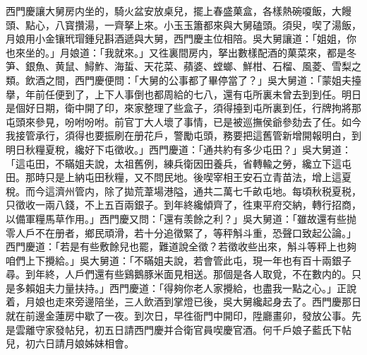 西門慶讓大舅房内坐的，騎火盆安放桌兒，擺上春盛菓盒，各樣熱碗嗄飯，大饅頭、點心，八寳攢湯，一齊拏上來。小玉玉簫都來與大舅磕頭。須臾，喫了湯飯，月娘用小金镶玳瑁鍾兒斟酒遞與大舅，西門慶主位相陪。吳大舅讓道：「姐姐，你也來坐的。」月娘道：「我就來。」又徃裏間房内，拏出數樣配酒的菓菜來，都是冬笋、銀魚、黄鼠、鱘鮓、海蜇、天花菜、蘋婆、螳螂、鮮柑、石榴、風菱、雪梨之類。飲酒之間，西門慶便問：「大舅的公事都了畢停當了？」吳大舅道：「蒙姐夫擡擧，年前任便到了，上下人事倒也都周給的七八，還有屯所裏未曾去到到任。明日是個好日期，衛中開了印，來家整理了些盒子，須得擡到屯所裏到任，行牌拘將那屯頭來參見，吩咐吩咐。前官丁大人壞了事情，已是被巡撫侯爺參劾去了任。如今我接管承行，須得也要振刷在册花戶，警勵屯頭，務要把這舊管新增開報明白，到明日秋糧夏稅，纔好下屯徵收。」西門慶道：「通共約有多少屯田？」吳大舅道：「這屯田，不瞞姐夫說，太祖舊例，練兵衛因田養兵，省轉輸之勞，纔立下這屯田。那時只是上納屯田秋糧，又不問民地。後喫宰相王安石立青苗法，增上這夏稅。而今這濟州管内，除了拋荒葦場港隘，通共二萬七千畝屯地。每頃秋税夏税，只徵收一兩八錢，不上五百兩銀子。到年終纔傾齊了，徃東平府交納，轉行招商，以備軍糧馬草作用。」西門慶又問：「還有羡餘之利？」吳大舅道：「雖故還有些抛零人戶不在册者，鄉民頑滑，若十分追徵緊了，等秤斛斗重，恐聲口致起公論。」西門慶道：「若是有些敷餘兒也罷，難道說全徵？若徵收些出來，斛斗等秤上也夠咱們上下攪給。」吳大舅道：「不瞞姐夫說，若會管此屯，現一年也有百十兩銀子尋。到年終，人戶們還有些鷄鵝豚米面見相送。那個是各人取覓，不在數内的。只是多賴姐夫力量扶持。」西門慶道：「得夠你老人家攪給，也盡我一點之心。」正說着，月娘也走來旁邊陪坐，三人飲酒到掌燈已後，吳大舅纔起身去了。西門慶那日就在前邊金蓮房中歇了一夜。到次日，早徃衙門中開印，陞廳畫卯，發放公事。先是雲離守家發帖兒，初五日請西門慶并合衛官員喫慶官酒。何千戶娘子藍氏下帖兒，初六日請月娘姊妹相會。

